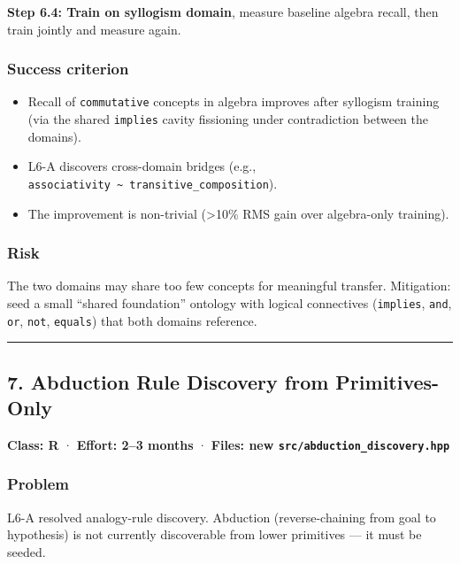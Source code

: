 \documentclass[
  11pt,
  a4paper,
]{article}
\providecommand{\tightlist}{%
  \setlength{\itemsep}{0pt}\setlength{\parskip}{0pt}}
\begin{document}
\textbf{Step 6.4: Train on syllogism domain}, measure baseline algebra
recall, then train jointly and measure again.

\subsubsection{Success criterion}\label{success-criterion-5}

\begin{itemize}
\tightlist
\item
  Recall of \texttt{commutative} concepts in algebra improves after
  syllogism training (via the shared \texttt{implies} cavity fissioning
  under contradiction between the domains).
\item
  L6-A discovers cross-domain bridges (e.g.,
  \texttt{associativity\ \textasciitilde{}\ transitive\_composition}).
\item
  The improvement is non-trivial (\textgreater10\% RMS gain over
  algebra-only training).
\end{itemize}

\subsubsection{Risk}\label{risk-2}

The two domains may share too few concepts for meaningful transfer.
Mitigation: seed a small ``shared foundation'' ontology with logical
connectives (\texttt{implies}, \texttt{and}, \texttt{or}, \texttt{not},
\texttt{equals}) that both domains reference.

\begin{center}\rule{0.5\linewidth}{0.5pt}\end{center}

\subsection{7. Abduction Rule Discovery from
Primitives-Only}\label{abduction-rule-discovery-from-primitives-only}

\textbf{Class: R} · \textbf{Effort: 2--3 months} · \textbf{Files: new
\texttt{src/abduction\_discovery.hpp}}

\subsubsection{Problem}\label{problem-6}

L6-A resolved analogy-rule discovery. Abduction (reverse-chaining from
goal to hypothesis) is not currently discoverable from lower primitives
--- it must be seeded.
\end{document}
